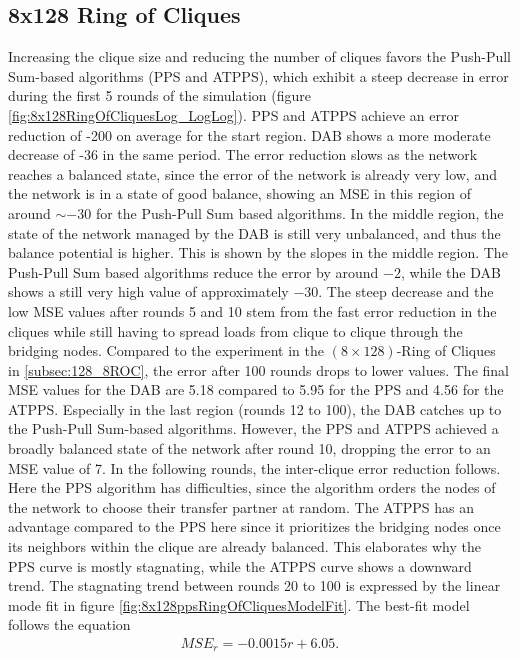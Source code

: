\subsection{8x128 Ring of Cliques}\label{subsec:8_128ROC}
Increasing the clique size and reducing the number of cliques favors the Push-Pull Sum-based algorithms (PPS and ATPPS), which exhibit a steep decrease in error during the first 5 rounds of the simulation (figure \ref{fig:8x128RingOfCliquesLog_LogLog}). PPS and ATPPS achieve an error reduction of -200 on average for the start region. DAB shows a more moderate decrease of -36 in the same period. The error reduction slows as the network reaches a balanced state, since the error of the network is already very low, and the network is in a state of good balance, showing an MSE in this region of around $\sim -30$ for the Push-Pull Sum based algorithms. In the middle region, the state of the network managed by the DAB is still very unbalanced, and thus the balance potential is higher. This is shown by the slopes in the middle region. The Push-Pull Sum based algorithms reduce the error by around $-2$, while the DAB shows a still very high value of approximately $-30$. The steep decrease and the low MSE values after rounds 5 and 10 stem from the fast error reduction in the cliques while still having to spread loads from clique to clique through the bridging nodes. Compared to the experiment in the $(8 \times 128)$-Ring of Cliques in \ref{subsec:128_8ROC}, the error after 100 rounds drops to lower values. The final MSE values for the DAB are 5.18 compared to 5.95 for the PPS and 4.56 for the ATPPS. Especially in the last region (rounds 12 to 100), the DAB catches up to the Push-Pull Sum-based algorithms. However, the PPS and ATPPS achieved a broadly balanced state of the network after round 10, dropping the error to an MSE value of 7. In the following rounds, the inter-clique error reduction follows. Here the PPS algorithm has difficulties, since the algorithm orders the nodes of the network to choose their transfer partner at random. The ATPPS has an advantage compared to the PPS here since it prioritizes the bridging nodes once its neighbors within the clique are already balanced. This elaborates why the PPS curve is mostly stagnating, while the ATPPS curve shows a downward trend. The stagnating trend between rounds 20 to 100 is expressed by the linear mode fit in figure \ref{fig:8x128ppsRingOfCliquesModelFit}. The best-fit model follows the equation
\begin{align}
    MSE_r=-0.0015r+6.05. 
\end{align}
